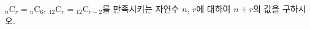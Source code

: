 \hspace*{2mm}\begin{minipage}[t]{\dimexpr\linewidth-2mm\relax}\vspace{0pt}
${}_n\mathrm{C}_r={}_n\mathrm{C}_6$, ${}_{12}\mathrm{C}_r={}_{12}\mathrm{C}_{r-2}$를 만족시키는 자연수 $n$, $r$에 대하여 $n+r$의 값을 구하시오.\end{minipage}
